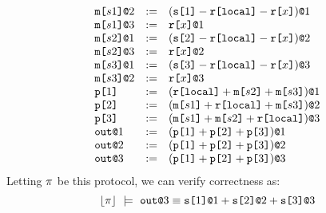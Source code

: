 $$
\begin{array}{lll}
  \elab{\mesg{s1}}{2} &:=& \elab{(\secret{1} \fminus \locflip \fminus \flip{x})}{1} \\ 
  \elab{\mesg{s1}}{3} &:=& \elab{\flip{x}}{1} \\ 
  \elab{\mesg{s2}}{1} &:=& \elab{(\secret{2} \fminus \locflip \fminus \flip{x})}{2} \\ 
  \elab{\mesg{s2}}{3} &:=& \elab{\flip{x}}{2} \\ 
  \elab{\mesg{s3}}{1} &:=& \elab{(\secret{3} \fminus \locflip \fminus \flip{x})}{3} \\ 
  \elab{\mesg{s3}}{2} &:=& \elab{\flip{x}}{3}\\
  \rvl{1} &:=& \elab{(\locflip \fplus \mesg{s2} \fplus \mesg{s3})}{1} \\ 
  \rvl{2} &:=& \elab{(\mesg{s1} \fplus \locflip \fplus \mesg{s3})}{2} \\
  \rvl{3} &:=& \elab{(\mesg{s1} \fplus \mesg{s2} \fplus \locflip)}{3} \\
  \out{1} &:=& \elab{(\rvl{1} \fplus \rvl{2} + \rvl{3})}{1}\\
  \out{2} &:=& \elab{(\rvl{1} \fplus \rvl{2} + \rvl{3})}{2}\\
  \out{3} &:=& \elab{(\rvl{1} \fplus \rvl{2} + \rvl{3})}{3}
\end{array}
$$
Letting $\prog$ be this protocol, we can verify correctness
as:
$$
\toeq{\prog}\ \models\ \out{3} \eop \sx{1}{1} \fplus \sx{2}{2} \fplus \sx{3}{3}
$$
